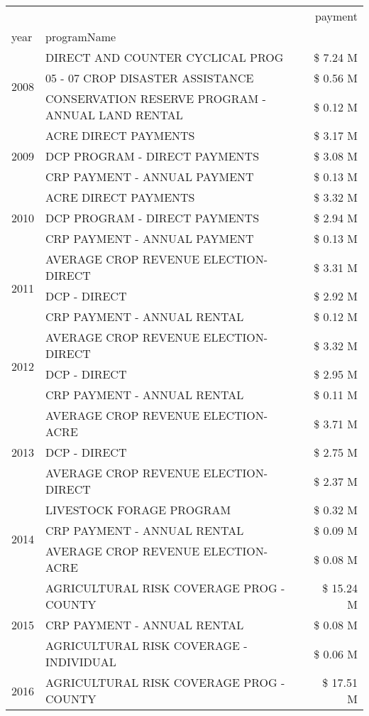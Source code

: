 \begin{tabular}{llr}
\toprule
 &  & payment \\
year & programName &  \\
\midrule
\multirow[t]{3}{*}{2008} & DIRECT AND COUNTER CYCLICAL PROG & \$ 7.24 M \\
 & 05 - 07 CROP DISASTER ASSISTANCE & \$ 0.56 M \\
 & CONSERVATION RESERVE PROGRAM - ANNUAL LAND RENTAL & \$ 0.12 M \\
\cline{1-3}
\multirow[t]{3}{*}{2009} & ACRE DIRECT PAYMENTS & \$ 3.17 M \\
 & DCP PROGRAM - DIRECT PAYMENTS & \$ 3.08 M \\
 & CRP PAYMENT - ANNUAL PAYMENT & \$ 0.13 M \\
\cline{1-3}
\multirow[t]{3}{*}{2010} & ACRE DIRECT PAYMENTS & \$ 3.32 M \\
 & DCP PROGRAM - DIRECT PAYMENTS & \$ 2.94 M \\
 & CRP PAYMENT - ANNUAL PAYMENT & \$ 0.13 M \\
\cline{1-3}
\multirow[t]{3}{*}{2011} & AVERAGE CROP REVENUE ELECTION-DIRECT & \$ 3.31 M \\
 & DCP - DIRECT & \$ 2.92 M \\
 & CRP PAYMENT - ANNUAL RENTAL & \$ 0.12 M \\
\cline{1-3}
\multirow[t]{3}{*}{2012} & AVERAGE CROP REVENUE ELECTION-DIRECT & \$ 3.32 M \\
 & DCP - DIRECT & \$ 2.95 M \\
 & CRP PAYMENT - ANNUAL RENTAL & \$ 0.11 M \\
\cline{1-3}
\multirow[t]{3}{*}{2013} & AVERAGE CROP REVENUE ELECTION-ACRE & \$ 3.71 M \\
 & DCP - DIRECT & \$ 2.75 M \\
 & AVERAGE CROP REVENUE ELECTION-DIRECT & \$ 2.37 M \\
\cline{1-3}
\multirow[t]{3}{*}{2014} & LIVESTOCK FORAGE PROGRAM & \$ 0.32 M \\
 & CRP PAYMENT - ANNUAL RENTAL & \$ 0.09 M \\
 & AVERAGE CROP REVENUE ELECTION-ACRE & \$ 0.08 M \\
\cline{1-3}
\multirow[t]{3}{*}{2015} & AGRICULTURAL RISK COVERAGE PROG - COUNTY & \$ 15.24 M \\
 & CRP PAYMENT - ANNUAL RENTAL & \$ 0.08 M \\
 & AGRICULTURAL RISK COVERAGE - INDIVIDUAL & \$ 0.06 M \\
\cline{1-3}
\multirow[t]{3}{*}{2016} & AGRICULTURAL RISK COVERAGE PROG - COUNTY & \$ 17.51 M \\

\end{tabular}
